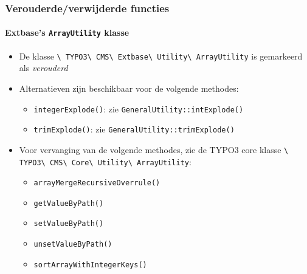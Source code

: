 \begin{frame}[fragile]
	\frametitle{Verouderde/verwijderde functies}
	\framesubtitle{Extbase's \texttt{ArrayUtility} klasse}

	\begin{itemize}
		\item De klasse
			\texttt{\textbackslash
				TYPO3\textbackslash
				CMS\textbackslash
				Extbase\textbackslash
				Utility\textbackslash
				ArrayUtility} is gemarkeerd als \textit{verouderd}

		\item Alternatieven zijn beschikbaar voor de volgende methodes:

			\begin{itemize}
				\item \texttt{integerExplode()}: zie \texttt{GeneralUtility::intExplode()}
				\item \texttt{trimExplode()}: zie \texttt{GeneralUtility::trimExplode()}
			\end{itemize}

		\item Voor vervanging van de volgende methodes, zie de TYPO3 core klasse
			\texttt{\textbackslash
				TYPO3\textbackslash
				CMS\textbackslash
				Core\textbackslash
				Utility\textbackslash
				ArrayUtility}:

			\begin{itemize}
				\item \texttt{arrayMergeRecursiveOverrule()}
				\item \texttt{getValueByPath()}
				\item \texttt{setValueByPath()}
				\item \texttt{unsetValueByPath()}
				\item \texttt{sortArrayWithIntegerKeys()}
			\end{itemize}

	\end{itemize}

\end{frame}




